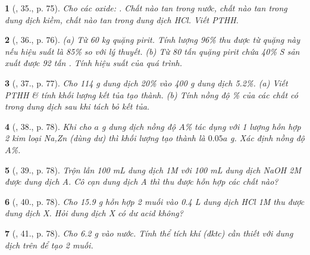 \documentclass{article}
\newtheorem{baitoan}{}
\begin{document}
\begin{baitoan}[\cite{An_Hoa_Hoc_nang_cao_8_9}, 35., p. 75]
	Cho các oxide: {\rm{}}. Chất nào tan trong nước, chất nào tan trong dung dịch kiềm, chất nào tan trong dung dịch {\rm HCl}. Viết PTHH.
\end{baitoan}

\begin{baitoan}[\cite{An_Hoa_Hoc_nang_cao_8_9}, 36., p. 76]
	(a) Từ {\rm60 kg} quặng pirit. Tính lượng {\rm{} 96\%} thu được từ quặng này nếu hiệu suất là {\rm85\%} so với lý thuyết. (b) Từ {\rm80} tấn quặng pirit chứa {\rm40\% S} sản xuất được {\rm92} tấn {\rm{}}. Tính hiệu suất của quá trình.
\end{baitoan}

\begin{baitoan}[\cite{An_Hoa_Hoc_nang_cao_8_9}, 37., p. 77]
	Cho {\rm114 g} dung dịch {\rm{} 20\%} vào {\rm400 g} dung dịch {\rm{} 5.2\%}. (a) Viết PTHH \& tính khối lượng kết tủa tạo thành. (b) Tính nồng độ {\rm\%} của các chất có trong dung dịch sau khi tách bỏ kết tủa.
\end{baitoan}

\begin{baitoan}[\cite{An_Hoa_Hoc_nang_cao_8_9}, 38., p. 78]
	Khi cho $a$ {\rm g} dung dịch {\rm {}} nồng độ $A${\rm\%} tác dụng với 1 lượng hỗn hợp 2 kim loại {\rm Na,Zn} (dùng dư) thì khối lượng {\rm {}} tạo thành là $0.05a$ {\rm g}. Xác định nồng độ $A${\rm\%}.
\end{baitoan}

\begin{baitoan}[\cite{An_Hoa_Hoc_nang_cao_8_9}, 39., p. 78]
	Trộn lẫn {\rm100 mL} dung dịch {\rm{} 1M} với {\rm100 mL} dung dịch {\rm NaOH 2M} được dung dịch A. Cô cạn dung dịch A thì thu được hỗn hợp các chất nào?
\end{baitoan}

\begin{baitoan}[\cite{An_Hoa_Hoc_nang_cao_8_9}, 40., p. 78]
	Cho {\rm15.9 g} hỗn hợp 2 muối {\rm{}} vào {\rm0.4 L} dung dịch {\rm HCl 1M} thu được dung dịch X. Hỏi dung dịch X có dư acid không?
\end{baitoan}

\begin{baitoan}[\cite{An_Hoa_Hoc_nang_cao_8_9}, 41., p. 78]
	Cho {\rm6.2 g } vào nước. Tính thể tích khí {\rm{}} (đktc) cần thiết với dung dịch trên để tạo 2 muối.
\end{baitoan}
\end{document}

